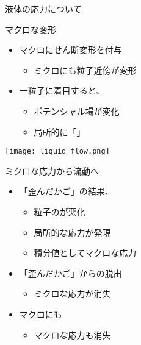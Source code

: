 \documentclass[uplatex,dvipdfmx,a4paper,11pt]{jsarticle}
\begin{document}
\begin{qlist}
\begin{qlist2}
			\qitem 液体の応力について
				\begin{center}
					\begin{minipage}{0.42\textwidth}
						\begin{itembox}[l]{マクロな変形}
							\begin{itemize}
								\item マクロにせん断変形を付与
								\begin{itemize}
									\item ミクロにも粒子近傍が変形
								\end{itemize}
								\item 一粒子に着目すると、
								\begin{itemize}
									\item ポテンシャル場が変化
									\item 局所的に「\qbox{}」
								\end{itemize}
							\end{itemize}
						\end{itembox}
						\begin{center}
							\texttt{[image: liquid\_flow.png]}
						\end{center}
					\end{minipage}
					\begin{minipage}{0.42\textwidth}
						\begin{itembox}[l]{ミクロな応力から流動へ}
							\begin{itemize}
								\item 「歪んだかご」の結果、
								\begin{itemize}
									\item 粒子の\qbox{}が悪化
									\item 局所的な応力が発現
									\item 積分値としてマクロな応力
								\end{itemize}
								\item 「歪んだかご」からの脱出
								\begin{itemize}
									\item ミクロな応力が消失
								\end{itemize}
								\item マクロにも\qbox{}
								\begin{itemize}
									\item マクロな応力も消失
								\end{itemize}
							\end{itemize}
						\end{itembox}
					\end{minipage}
				\end{center}
		\end{qlist2}


\end{qlist}
\end{document}
